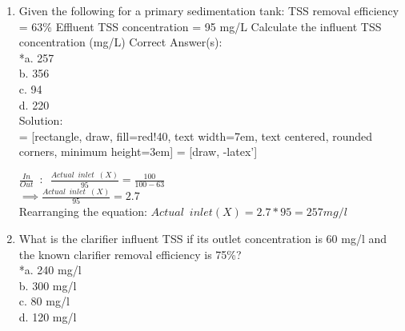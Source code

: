 \documentclass{article}
\begin{document}
\begin{enumerate}



\item  Given the following for a primary sedimentation tank: TSS removal efficiency = 63\% Effluent TSS concentration = 95 mg/L Calculate the influent TSS concentration (mg/L) Correct Answer(s): \\

*a. 257 \\
b. 356 \\
c. 94 \\
d. 220 \\

Solution:\\

 = [rectangle, draw, fill=red!40, 
    text width=7em, text centered, rounded corners, minimum height=3em]
 = [draw, -latex']
\begin{figure}[!h]
\centering
{}
\end{figure}

$\frac{In}{Out} \enspace : \enspace \frac{Actual \enspace inlet \enspace  (X)}{95}=\frac{100}{100-63}$\\
$\implies \frac{Actual \enspace inlet \enspace  (X)}{95}=2.7$\\    
Rearranging the equation:   $Actual \enspace inlet (X)=2.7*95 = \boxed{257 mg/l}$\\



\item What is the clarifier influent TSS if its outlet concentration is 60 mg/l and the known clarifier removal efficiency is 75\%? \\
*a. 240 mg/l \\
b. 300 mg/l \\
c. 80 mg/l \\
d. 120 mg/l \\


\end{enumerate}
\end{document}
